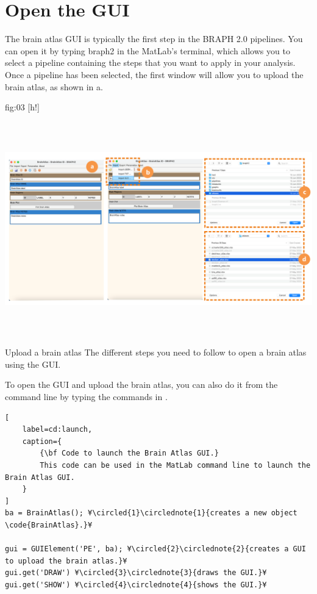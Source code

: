 \documentclass[justified]{tufte-handout}
\begin{document}
\clearpage
\section{Open the GUI}

The brain atlas GUI is typically the first step in the BRAPH 2.0 pipelines. You can open it by typing braph2 in the MatLab's terminal, which allows you to select a pipeline containing the steps that you want to apply in your analysis. Once a pipeline has been selected, the first window will allow you to upload the brain atlas, as shown in a.

	{fig:03}
	{
	[h!]
	\includegraphics[height=10cm]{tut_ba/fig03.png}
	}
	{Upload a brain atlas}
	{
	The different steps you need to follow to open a brain atlas using the GUI. 
	}

To open the GUI and upload the brain atlas, you can also do it from the command line by typing the commands in .
%
\begin{lstlisting}[
	label=cd:launch,
	caption={
		{\bf Code to launch the Brain Atlas GUI.}
		This code can be used in the MatLab command line to launch the  Brain Atlas GUI.
	}
]
ba = BrainAtlas(); ¥\circled{1}\circlednote{1}{creates a new object \code{BrainAtlas}.}¥

gui = GUIElement('PE', ba); ¥\circled{2}\circlednote{2}{creates a GUI to upload the brain atlas.}¥
gui.get('DRAW') ¥\circled{3}\circlednote{3}{draws the GUI.}¥
gui.get('SHOW') ¥\circled{4}\circlednote{4}{shows the GUI.}¥
\end{lstlisting}
\end{document}
